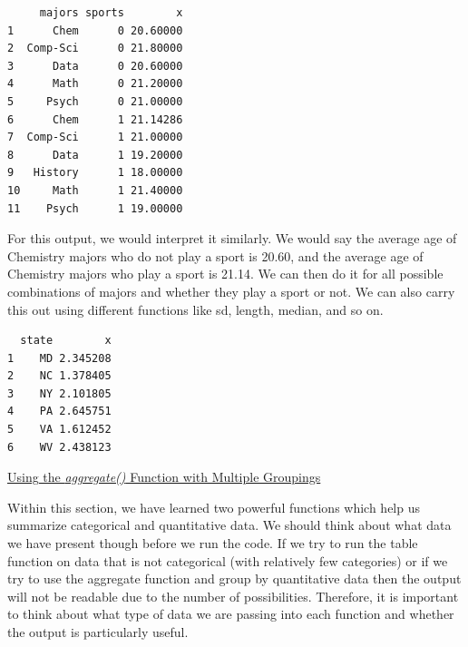 \documentclass[
  letterpaper,
  DIV=11,
  numbers=noendperiod]{scrreprt}
\newenvironment{Shaded}{\begin{snugshade}}{\end{snugshade}}
\newcommand{\AttributeTok}[1]{\textcolor[rgb]{0.40,0.45,0.13}{#1}}
\newcommand{\FunctionTok}[1]{\textcolor[rgb]{0.28,0.35,0.67}{#1}}
\newcommand{\NormalTok}[1]{\textcolor[rgb]{0.00,0.23,0.31}{#1}}
\newcommand{\SpecialCharTok}[1]{\textcolor[rgb]{0.37,0.37,0.37}{#1}}
\begin{document}
\begin{Shaded}
\end{Shaded}

\begin{verbatim}
     majors sports        x
1      Chem      0 20.60000
2  Comp-Sci      0 21.80000
3      Data      0 20.60000
4      Math      0 21.20000
5     Psych      0 21.00000
6      Chem      1 21.14286
7  Comp-Sci      1 21.00000
8      Data      1 19.20000
9   History      1 18.00000
10     Math      1 21.40000
11    Psych      1 19.00000
\end{verbatim}

For this output, we would interpret it similarly. We would say the
average age of Chemistry majors who do not play a sport is 20.60, and
the average age of Chemistry majors who play a sport is 21.14. We can
then do it for all possible combinations of majors and whether they play
a sport or not. We can also carry this out using different functions
like sd, length, median, and so on.

\begin{Shaded}
\end{Shaded}

\begin{verbatim}
  state        x
1    MD 2.345208
2    NC 1.378405
3    NY 2.101805
4    PA 2.645751
5    VA 1.612452
6    WV 2.438123
\end{verbatim}

\begin{watch}{}{}
    \href{https://youtu.be/OsadIjZEIR0}{Using the \textit{aggregate()} Function with Multiple Groupings}
\end{watch}

Within this section, we have learned two powerful functions which help
us summarize categorical and quantitative data. We should think about
what data we have present though before we run the code. If we try to
run the table function on data that is not categorical (with relatively
few categories) or if we try to use the aggregate function and group by
quantitative data then the output will not be readable due to the number
of possibilities. Therefore, it is important to think about what type of
data we are passing into each function and whether the output is
particularly useful.
\end{document}
